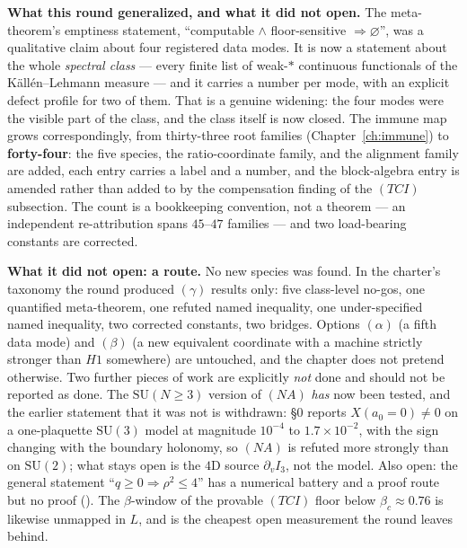 \textbf{What this round generalized, and what it did not open.} The meta-theorem's emptiness
statement, ``computable $\wedge$ floor-sensitive $\Rightarrow\varnothing$'', was a qualitative claim
about four registered data modes. It is now a statement about the whole \emph{spectral class} ---
every finite list of weak-$*$ continuous functionals of the K\"all\'en--Lehmann measure --- and it
carries a number per mode, with an explicit defect profile for two of them. That is a genuine
widening: the four modes were the visible part of the class, and the class itself is now closed. The
immune map grows correspondingly, from thirty-three root families (Chapter~\ref{ch:immune}) to
\textbf{forty-four}: the five species, the ratio-coordinate family, and the alignment family are added,
each entry carries a label and a number, and the block-algebra entry is amended rather than added to
by the compensation finding of the $(TCI)$ subsection. The count is a bookkeeping convention, not a
theorem --- an independent re-attribution spans $45$--$47$ families --- and two load-bearing constants
are corrected.

\textbf{What it did not open: a route.} No new species was found. In the charter's taxonomy the round
produced $(\gamma)$ results only: five class-level no-gos, one quantified meta-theorem, one refuted
named inequality, one under-specified named inequality, two corrected constants, two bridges.
Options $(\alpha)$ (a fifth data mode) and $(\beta)$ (a new equivalent coordinate with a machine
strictly stronger than $H1$ somewhere) are untouched, and the chapter does not pretend otherwise.
Two further pieces of work are explicitly \emph{not} done and should not be reported as done. The
$\mathrm{SU}(N\ge3)$ version of $(NA)$ \emph{has} now been tested, and the earlier statement that it
was not is withdrawn:  \S0 reports
$X(a_0=0)\neq0$ on a one-plaquette $\mathrm{SU}(3)$ model at magnitude $10^{-4}$ to
$1.7\times10^{-2}$, with the sign changing with the boundary holonomy, so $(NA)$ is refuted more
strongly than on $\mathrm{SU}(2)$; what stays open is the $4$D source $\partial_vI_3$, not the model.
Also open: the general statement
``$q\ge0\Rightarrow\rho^2\le4$'' has a numerical battery and a proof route but no proof (\LC). The
$\beta$-window of the provable $(TCI)$ floor below $\beta_c\approx0.76$ is likewise unmapped in $L$,
and is the cheapest open measurement the round leaves behind.

